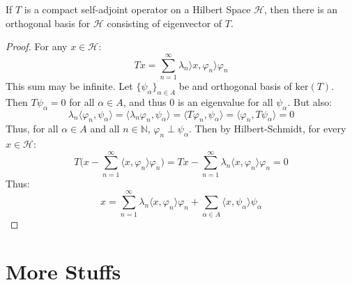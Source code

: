         \begin{theorem}
            If $T$ is a compact self-adjoint operator
            on a Hilbert Space $\mathscr{H}$, then there is
            an orthogonal basis for $\mathscr{H}$
            consisting of eigenvector of $T$.
        \end{theorem}
        \begin{proof}
            For any $x\in\mathscr{H}$:
            \begin{equation*}
                Tx=\sum_{n=1}^{\infty}\lambda_{n}
                \rangle{x},\varphi_{n}\rangle\varphi_{n}
            \end{equation*}
            This sum may be infinite.
            Let $\{\psi_{\alpha}\}_{\alpha\in{A}}$ be
            and orthogonal basis of $\mathrm{ker}(T)$. Then
            $T\psi_{\alpha}=0$ for all $\alpha\in{A}$,
            and thus $0$ is an eigenvalue for all
            $\psi_{\alpha}$. But also:
            \begin{equation*}
                \lambda_{n}\langle\varphi_{n},
                \psi_{\alpha}\rangle
                =\langle\lambda_{n}\varphi_{n},
                \psi_{\alpha}\rangle
                =\langle{T}\varphi_{n},\psi_{\alpha}\rangle
                =\langle\varphi_{n},T\psi_{\alpha}\rangle
                =0
            \end{equation*}
            Thus, for all $\alpha\in{A}$ and all
            $n\in\mathbb{N}$,
            $\varphi_{n}\perp\psi_{\alpha}$. Then by
            Hilbert-Schmidt, for every $x\in\mathscr{H}$:
            \begin{equation*}
                T\big(x-\sum_{n=1}^{\infty}
                \langle{x},\varphi_{n}\rangle\varphi_{n}\big)
                =Tx-\sum_{n=1}^{\infty}\lambda_{n}
                \langle{x},\varphi_{n}\rangle\varphi_{n}=0
            \end{equation*}
            Thus:
            \begin{equation*}
                x=\sum_{n=1}^{\infty}\lambda_{n}
                \langle{x},\varphi_{n}\rangle\varphi_{n}+
                \sum_{\alpha\in{A}}
                \langle{x},\psi_{\alpha}\rangle\psi_{\alpha}
            \end{equation*}
        \end{proof}
\chapter{More Stuffs}
